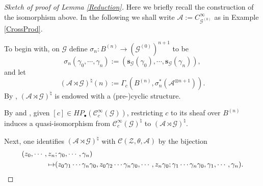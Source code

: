 \documentclass[a4paper]{amsart}
\newcommand{\maA}{\mathcal A}
\newcommand{\maC}{\mathcal C}
\newcommand{\maG}{\mathcal G}
\newcommand{\maZ}{\mathcal Z}
\newcommand{\bs}{\mathbf{s}}
\newcommand\<{\langle}
\renewcommand\>{\rangle}
\theoremstyle{definition}
\theoremstyle{remark}
\begin{document}
\begin{proof}[Sketch of proof of Lemma \ref{Reduction}]
Here we briefly recall the construction of the isomorphism above.
In the following we shall write $\maA := C^\infty _{\maG ^{(0)}}$ as in Example \ref{CrossProd}.

To begin with, on $\maG$ define $ \sigma _n : B ^{(n)} \to (\maG ^{(0)})^{n+1}$ to be
$$ \sigma _n (\gamma _0, \cdots , \gamma _n) := (\bs _\maG (\gamma _0), \cdots, \bs _\maG (\gamma _n)),$$
and let
\begin{equation}
\label{AlgCross}
(\maA \rtimes \maG) ^\natural (n) := \Gamma _c (B ^{(n)} , \sigma _n ^* (\maA ^{\otimes n+1})) .
\end{equation}
By \cite[Lemma 3.30]{Crainic;EtaleGpoid}, $(\maA \rtimes \maG) ^\natural$ is endowed with a (pre-)cyclic structure.

By \cite[Lemma 3.34]{Crainic;EtaleGpoid} and \cite[Section 3]{Nistor;EtaleCyclicHomology},
given $[c] \in H P _\bullet (\maC _c ^\infty (\maG))$,
restricting $c$ to its sheaf over $B ^{(n)}$ induces a quasi-isomorphism from
$\maC^{\infty}_c (\maG ) ^\natural$ to $(\maA \rtimes \maG) ^\natural$.

Next, one identifies $(\maA \rtimes \maG) ^\natural$ with $\maC (\maZ , \theta , \maA)$
by the bijection \cite[Proposition 3.36]{Crainic;EtaleGpoid}
\begin{align}
\label{Twist}
(z_0, \cdots, z_n &; \gamma _0, \cdots, \gamma _n) \\ \nonumber
\mapsto & (z_0 \gamma_1 \cdots \gamma_n \gamma_0, z_0 \gamma_2 \cdots \gamma_n \gamma_0, \cdots, z_n \gamma _0;
\gamma_1 \cdots \gamma_n \gamma_0, \gamma_1, \cdots, \gamma_n). \qedhere
\end{align}
\end{proof}
\end{document}
